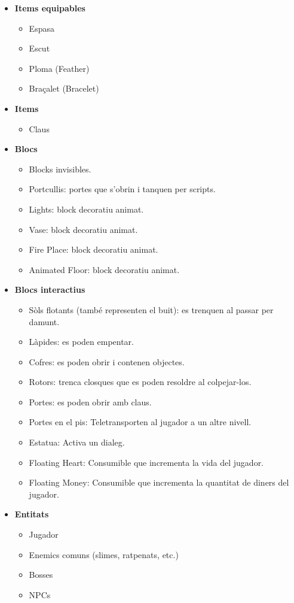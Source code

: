 \documentclass[a4paper,12pt]{article}
\begin{document}
\begin{itemize}
    \item \textbf{Items equipables}
    \begin{itemize}
        \item Espasa
        \item Escut
        \item Ploma (Feather)
        \item Braçalet (Bracelet)
    \end{itemize}
    \item \textbf{Items}
    \begin{itemize}
        \item Claus
    \end{itemize}
    \item \textbf{Blocs}
    \begin{itemize}
        \item Blocks invisibles.
        \item Portcullis: portes que s'obrin i tanquen per scripts.
        \item Lights: block decoratiu animat.
        \item Vase: block decoratiu animat.
        \item Fire Place: block decoratiu animat.
        \item Animated Floor: block decoratiu animat.
    \end{itemize}
    \item \textbf{Blocs interactius}
    \begin{itemize}
        \item Sòls flotants (també representen el buit): es trenquen al passar per damunt.
        \item Làpides: es poden empentar.
        \item Cofres: es poden obrir i contenen objectes.
        \item Rotors: trenca closques que es poden resoldre al colpejar-los.
        \item Portes: es poden obrir amb claus.
        \item Portes en el pis: Teletransporten al jugador a un altre nivell.
        \item Estatua: Activa un dialeg.
        \item Floating Heart: Consumible que incrementa la vida del jugador.
        \item Floating Money: Consumible que incrementa la quantitat de diners del jugador.
    \end{itemize}
    \item \textbf{Entitats}
    \begin{itemize}
        \item Jugador
        \item Enemics comuns (slimes, ratpenats, etc.)
        \item Bosses
        \item NPCs
    \end{itemize}
\end{itemize}
\end{document}
